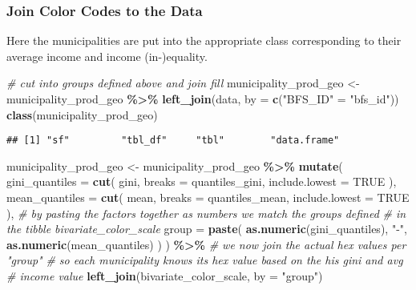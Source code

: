\documentclass[
]{article}
\newenvironment{Shaded}{\begin{snugshade}}{\end{snugshade}}
\newcommand{\AttributeTok}[1]{\textcolor[rgb]{0.13,0.29,0.53}{#1}}
\newcommand{\CommentTok}[1]{\textcolor[rgb]{0.56,0.35,0.01}{\textit{#1}}}
\newcommand{\ConstantTok}[1]{\textcolor[rgb]{0.56,0.35,0.01}{#1}}
\newcommand{\FunctionTok}[1]{\textcolor[rgb]{0.13,0.29,0.53}{\textbf{#1}}}
\newcommand{\NormalTok}[1]{#1}
\newcommand{\OtherTok}[1]{\textcolor[rgb]{0.56,0.35,0.01}{#1}}
\newcommand{\SpecialCharTok}[1]{\textcolor[rgb]{0.81,0.36,0.00}{\textbf{#1}}}
\newcommand{\StringTok}[1]{\textcolor[rgb]{0.31,0.60,0.02}{#1}}
\begin{document}
\hypertarget{join-color-codes-to-the-data}{%
\subsubsection{Join Color Codes to the
Data}\label{join-color-codes-to-the-data}}

Here the municipalities are put into the appropriate class corresponding
to their average income and income (in-)equality.

\begin{Shaded}
\begin{Highlighting}[]
\CommentTok{\# cut into groups defined above and join fill}
\NormalTok{municipality\_prod\_geo }\OtherTok{\textless{}{-}}\NormalTok{ municipality\_prod\_geo }\SpecialCharTok{\%\textgreater{}\%}
  \FunctionTok{left\_join}\NormalTok{(data, }\AttributeTok{by =} \FunctionTok{c}\NormalTok{(}\StringTok{"BFS\_ID"} \OtherTok{=} \StringTok{"bfs\_id"}\NormalTok{))}
\FunctionTok{class}\NormalTok{(municipality\_prod\_geo)}
\end{Highlighting}
\end{Shaded}

\begin{verbatim}
## [1] "sf"         "tbl_df"     "tbl"        "data.frame"
\end{verbatim}

\begin{Shaded}
\begin{Highlighting}[]
\NormalTok{municipality\_prod\_geo }\OtherTok{\textless{}{-}}\NormalTok{ municipality\_prod\_geo }\SpecialCharTok{\%\textgreater{}\%}
  \FunctionTok{mutate}\NormalTok{(}
    \AttributeTok{gini\_quantiles =} \FunctionTok{cut}\NormalTok{(}
\NormalTok{      gini,}
      \AttributeTok{breaks =}\NormalTok{ quantiles\_gini,}
      \AttributeTok{include.lowest =} \ConstantTok{TRUE}
\NormalTok{    ),}
    \AttributeTok{mean\_quantiles =} \FunctionTok{cut}\NormalTok{(}
\NormalTok{      mean,}
      \AttributeTok{breaks =}\NormalTok{ quantiles\_mean,}
      \AttributeTok{include.lowest =} \ConstantTok{TRUE}
\NormalTok{    ),}
    \CommentTok{\# by pasting the factors together as numbers we match the groups defined}
    \CommentTok{\# in the tibble bivariate\_color\_scale}
    \AttributeTok{group =} \FunctionTok{paste}\NormalTok{(}
      \FunctionTok{as.numeric}\NormalTok{(gini\_quantiles), }\StringTok{"{-}"}\NormalTok{,}
      \FunctionTok{as.numeric}\NormalTok{(mean\_quantiles)}
\NormalTok{    )}
\NormalTok{  ) }\SpecialCharTok{\%\textgreater{}\%}
  \CommentTok{\# we now join the actual hex values per "group"}
  \CommentTok{\# so each municipality knows its hex value based on the his gini and avg}
  \CommentTok{\# income value}
  \FunctionTok{left\_join}\NormalTok{(bivariate\_color\_scale, }\AttributeTok{by =} \StringTok{"group"}\NormalTok{)}
\end{Highlighting}
\end{Shaded}
\end{document}
